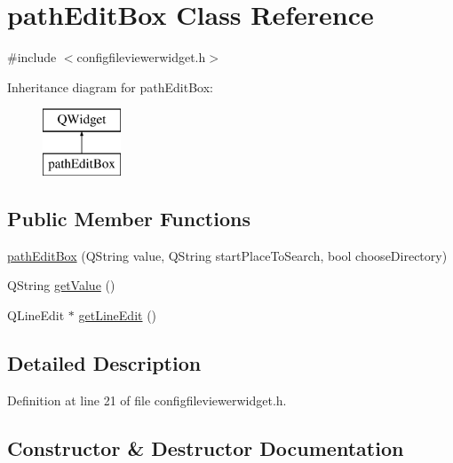 \hypertarget{classpath_edit_box}{}\section{path\+Edit\+Box Class Reference}
\label{classpath_edit_box}


{\ttfamily \#include $<$configfileviewerwidget.\+h$>$}

Inheritance diagram for path\+Edit\+Box\+:\begin{figure}[H]
\begin{center}
\leavevmode
\includegraphics[height=2.000000cm]{classpath_edit_box}
\end{center}
\end{figure}
\subsection*{Public Member Functions}
\begin{DoxyCompactItemize}
\item 
\mbox{\hyperlink{classpath_edit_box_a43dc1e0ee9cd5d02097804a4e19c7a7e}{path\+Edit\+Box}} (Q\+String value, Q\+String start\+Place\+To\+Search, bool choose\+Directory)
\item 
Q\+String \mbox{\hyperlink{classpath_edit_box_aad823e4a342f4a028ab9a5f619966ed9}{get\+Value}} ()
\item 
Q\+Line\+Edit $\ast$ \mbox{\hyperlink{classpath_edit_box_a0f16b945ca7ab67e1def8948ca47ed2b}{get\+Line\+Edit}} ()
\end{DoxyCompactItemize}


\subsection{Detailed Description}


Definition at line 21 of file configfileviewerwidget.\+h.



\subsection{Constructor \& Destructor Documentation}
\mbox{\label{classpath_edit_box_a43dc1e0ee9cd5d02097804a4e19c7a7e}} 
